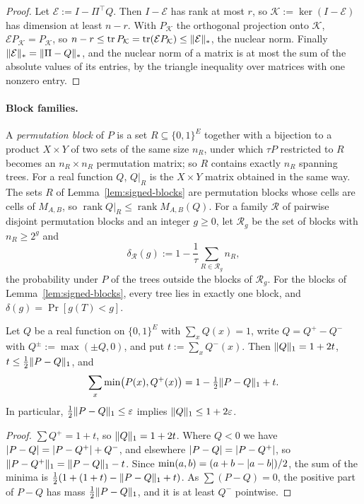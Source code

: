 \begin{proof}
Let $\mathcal E:=I-\Pi^{\top}Q$. Then $I-\mathcal E$ has rank at most $r$, so $\mathcal K:=\ker(I-\mathcal E)$ has dimension at least $n-r$. With $P_{\mathcal K}$ the orthogonal projection onto $\mathcal K$, $\mathcal EP_{\mathcal K}=P_{\mathcal K}$, so $n-r\le\operatorname{tr}P_{\mathcal K}=\operatorname{tr}(\mathcal EP_{\mathcal K})\le\lVert \mathcal E\rVert_*$, the nuclear norm. Finally $\lVert \mathcal E\rVert_*=\lVert \Pi-Q\rVert_*$, and the nuclear norm of a matrix is at most the sum of the absolute values of its entries, by the triangle inequality over matrices with one nonzero entry.
\end{proof}

\paragraph{Block families.} A \emph{permutation block} of $P$ is a set $R\subseteq\{0,1\}^E$ together with a bijection to a product $X\times Y$ of two sets of the same size $n_R$, under which $\tau P$ restricted to $R$ becomes an $n_R\times n_R$ permutation matrix; so $R$ contains exactly $n_R$ spanning trees. For a real function $Q$, $Q|_R$ is the $X\times Y$ matrix obtained in the same way. The sets $R$ of Lemma~\ref{lem:signed-blocks} are permutation blocks whose cells are cells of $M_{A,B}$, so $\operatorname{rank}Q|_R\le\operatorname{rank}M_{A,B}(Q)$. For a family $\mathcal R$ of pairwise disjoint permutation blocks and an integer $g\ge0$, let $\mathcal R_g$ be the set of blocks with $n_R\ge2^g$ and
\[
  \delta_{\mathcal R}(g):=1-\frac1\tau\sum_{R\in\mathcal R_g}n_R ,
\]
the probability under $P$ of the trees outside the blocks of $\mathcal R_g$. For the blocks of Lemma~\ref{lem:signed-blocks}, every tree lies in exactly one block, and $\delta(g)=\Pr[g(T)<g]$.

\begin{lemma}\label{lem:fact-n}
Let $Q$ be a real function on $\{0,1\}^E$ with $\sum_xQ(x)=1$, write $Q=Q^+-Q^-$ with $Q^\pm:=\max(\pm Q,0)$, and put $t:=\sum_xQ^-(x)$. Then $\lVert Q\rVert_1=1+2t$, $t\le\frac12\lVert P-Q\rVert_1$, and
\[
  \sum_x\min\bigl(P(x),Q^+(x)\bigr)=1-\tfrac12\lVert P-Q\rVert_1+t .
\]
In particular, $\frac12\lVert P-Q\rVert_1\le\varepsilon$ implies $\lVert Q\rVert_1\le1+2\varepsilon$.
\end{lemma}

\begin{proof}
$\sum Q^+=1+t$, so $\lVert Q\rVert_1=1+2t$. Where $Q<0$ we have $\lvert P-Q\rvert=\lvert P-Q^+\rvert+Q^-$, and elsewhere $\lvert P-Q\rvert=\lvert P-Q^+\rvert$, so $\lVert P-Q^+\rVert_1=\lVert P-Q\rVert_1-t$. Since $\min(a,b)=(a+b-\lvert a-b\rvert)/2$, the sum of the minima is $\frac12(1+(1+t)-\lVert P-Q\rVert_1+t)$. As $\sum(P-Q)=0$, the positive part of $P-Q$ has mass $\frac12\lVert P-Q\rVert_1$, and it is at least $Q^-$ pointwise.
\end{proof}

